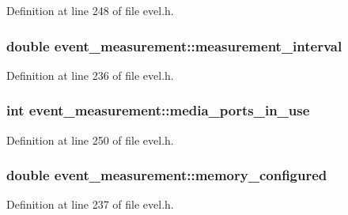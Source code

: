 Definition at line 248 of file evel.\+h.

\hypertarget{structevent__measurement_a50125c8776bfb0f86393c796b0b99bb2}{}
\subsubsection[{measurement\+\_\+interval}]{\setlength{\rightskip}{0pt plus 5cm}double event\+\_\+measurement\+::measurement\+\_\+interval}\label{structevent__measurement_a50125c8776bfb0f86393c796b0b99bb2}


Definition at line 236 of file evel.\+h.

\hypertarget{structevent__measurement_a9789b096607aabab608fb9e223b247ef}{}
\subsubsection[{media\+\_\+ports\+\_\+in\+\_\+use}]{\setlength{\rightskip}{0pt plus 5cm}int event\+\_\+measurement\+::media\+\_\+ports\+\_\+in\+\_\+use}\label{structevent__measurement_a9789b096607aabab608fb9e223b247ef}


Definition at line 250 of file evel.\+h.

\hypertarget{structevent__measurement_a02a3c0c26ddc5861ec0266f13448eb70}{}
\subsubsection[{memory\+\_\+configured}]{\setlength{\rightskip}{0pt plus 5cm}double event\+\_\+measurement\+::memory\+\_\+configured}\label{structevent__measurement_a02a3c0c26ddc5861ec0266f13448eb70}


Definition at line 237 of file evel.\+h.

\hypertarget{structevent__measurement_a81914f75438f34fd5acc85ad6204e800}{}
